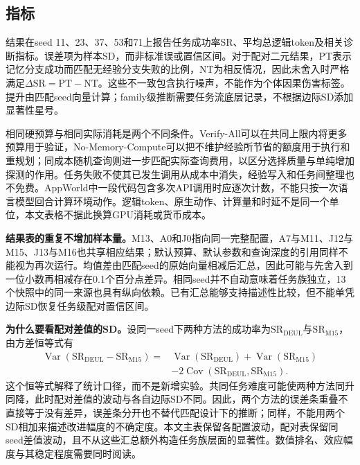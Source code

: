\documentclass[sigconf,anonymous,review]{acmart}
\DeclareMathOperator{\Cov}{Cov}
\DeclareMathOperator{\Var}{Var}
\theoremstyle{zhplain}
\begin{document}
\subsection{指标}
结果在seed 11、23、37、53和71上报告任务成功率SR、平均总逻辑token及相关诊断指标。误差项为样本SD，而非标准误或置信区间。对于配对二元结果，PT表示记忆分支成功而匹配无经验分支失败的比例，NT为相反情况，因此未舍入时严格满足\(\Delta\mathrm{SR}=\mathrm{PT}-\mathrm{NT}\)。这些不一致包含执行噪声，不能作为个体因果伤害标签。提升由匹配seed向量计算；family级推断需要任务流底层记录，不根据边际SD添加显著性星号。

相同硬预算与相同实际消耗是两个不同条件。Verify-All可以在共同上限内将更多预算用于验证，No-Memory-Compute可以把不维护经验所节省的额度用于执行和重规划；同成本随机查询则进一步匹配实际查询费用，以区分选择质量与单纯增加探测的作用。任务失败不使其已发生调用从成本中消失，经验写入和任务间整理也不免费。AppWorld中一段代码包含多次API调用时应逐次计数，不能只按一次语言模型回合计算环境动作。逻辑token、原生动作、计算量和时延不是同一个单位，本文表格不据此换算GPU消耗或货币成本。

\textbf{结果表的重复不增加样本量。}M13、A0和J0指向同一完整配置，A7与M11、J12与M15、J13与M16也共享相应结果；默认预算、默认参数和查询深度的引用同样不能视为再次运行。均值差由匹配seed的原始向量相减后汇总，因此可能与先舍入到一位小数再相减存在0.1个百分点差异。相同seed并不自动意味着任务族独立，13个快照中的同一来源也具有纵向依赖。已有汇总能够支持描述性比较，但不能单凭边际SD恢复任务级配对置信区间。

\textbf{为什么要看配对差值的SD。}设同一seed下两种方法的成功率为\(\mathrm{SR}_{\mathrm{DEUL}}\)与\(\mathrm{SR}_{\mathrm{M15}}\)，由方差恒等式有
\begin{equation}
\begin{aligned}
\Var(\mathrm{SR}_{\mathrm{DEUL}}-\mathrm{SR}_{\mathrm{M15}})
={}&\Var(\mathrm{SR}_{\mathrm{DEUL}})+\Var(\mathrm{SR}_{\mathrm{M15}})\\
&-2\Cov(\mathrm{SR}_{\mathrm{DEUL}},\mathrm{SR}_{\mathrm{M15}}).
\end{aligned}
\end{equation}
这个恒等式解释了统计口径，而不是新增实验。共同任务难度可能使两种方法同升同降，此时配对差值的波动与各自边际SD不同。因此，两个方法的误差条重叠不直接等于没有差异，误差条分开也不替代匹配设计下的推断；同样，不能用两个SD相加来描述改进幅度的不确定度。本文主表保留各配置波动，配对表保留同seed差值波动，且不从这些汇总额外构造任务族层面的显著性。数值排名、效应幅度与其稳定程度需要同时阅读。
\end{document}
